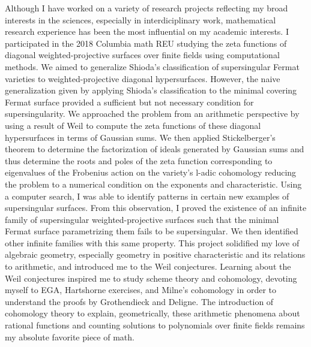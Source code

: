 \documentclass[11pt]{amsart}
\begin{document}
Although I have worked on a variety of research projects reflecting my broad interests in the sciences, especially in interdiciplinary work, mathematical research experience has been the most influential on my academic interests. I participated in the 2018 Columbia math REU studying the zeta functions of diagonal weighted-projective surfaces over finite fields using computational methods. We aimed to generalize Shioda’s classification of supersingular Fermat varieties to weighted-projective diagonal hypersurfaces. However, the naive generalization given by applying Shioda’s classification to the minimal covering Fermat surface provided a sufficient but not necessary condition for supersingularity. We approached the problem from an arithmetic perspective by using a result of Weil \cite{weil_counting} to compute the zeta functions of these diagonal hypersurfaces in terms of Gaussian sums. We then applied Stickelberger's theorem to determine the factorization of ideals generated by Gaussian sums and thus determine the roots and poles of the zeta function corresponding to eigenvalues of the Frobenius action on the variety’s l-adic cohomology reducing the problem to a numerical condition on the exponents and characteristic. Using a computer search, I was able to identify patterns in certain new examples of supersingular surfaces. From this observation, I proved the existence of an infinite family of supersingular weighted-projective surfaces such that the minimal Fermat surface parametrizing them fails to be supersingular. We then identified other infinite families with this same property. This project solidified my love of algebraic geometry, especially geometry in positive characteristic and its relations to arithmetic, and introduced me to the Weil conjectures. Learning about the Weil conjectures inspired me to study scheme theory and \etale cohomology, devoting myself to EGA, Hartshorne exercises, and Milne's \etale cohomology in order to understand the proofs by Grothendieck and Deligne. The introduction of \etale cohomology theory to explain, geometrically, these arithmetic phenomena about rational functions and counting solutions to polynomials over finite fields remains my absolute favorite piece of math.
\par
\end{document}
